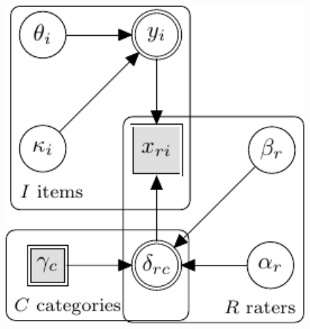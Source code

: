 \documentclass[a4paper,usenames,dvipsnames]{article}
\begin{document}
\begin{figure}[!ht]
	\begin{minipage}{0.6\textwidth}
		\centering
		\includegraphics[width=1\textwidth, page=10]{graphicalModels/graphicalModels.pdf}
	\end{minipage}\hfill
\begin{minipage}{0.4\textwidth}
{\large
	\begin{align*}

\end{align*}}
\end{minipage}
\end{figure}
\end{document}
